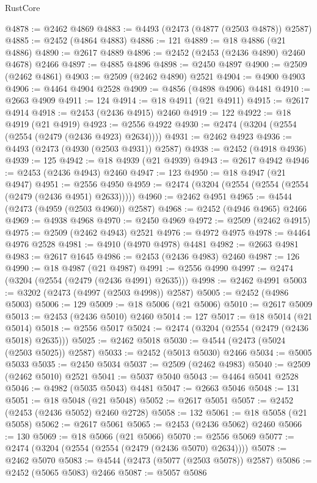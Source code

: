 \begin{lexlean}{RustCore}
\begin{coremodule}
@4878 := @2462 @4869
@4883 := @4493 (@2473 (@4877 (@2503 @4878)) @2587)
@4885 := @2452 (@4864 @4883)
@4886 := 121
@4889 := @18 @4886 (@21 @4886)
@4890 := @2617 @4889
@4896 := @2452 (@2453 (@2436 @4890) @2460 @4678) @2466
@4897 := @4885 @4896
@4898 := @2450 @4897
@4900 := @2509 (@2462 @4861)
@4903 := @2509 (@2462 @4890) @2521
@4904 := @4900 @4903
@4906 := @4464 @4904 @2528
@4909 := @4856 (@4898 @4906) @4481
@4910 := @2663 @4909
@4911 := 124
@4914 := @18 @4911 (@21 @4911)
@4915 := @2617 @4914
@4918 := @2453 (@2436 @4915) @2460
@4919 := 122
@4922 := @18 @4919 (@21 @4919)
@4923 := @2556 @4922
@4930 := @2474 (@3204 (@2554 (@2554 (@2479 (@2436 @4923) @2634))))
@4931 := @2462 @4923
@4936 := @4493 (@2473 (@4930 (@2503 @4931)) @2587)
@4938 := @2452 (@4918 @4936)
@4939 := 125
@4942 := @18 @4939 (@21 @4939)
@4943 := @2617 @4942
@4946 := @2453 (@2436 @4943) @2460
@4947 := 123
@4950 := @18 @4947 (@21 @4947)
@4951 := @2556 @4950
@4959 := @2474 (@3204 (@2554 (@2554 (@2554 (@2479 (@2436 @4951) @2633)))))
@4960 := @2462 @4951
@4965 := @4544 (@2473 (@4959 (@2503 @4960)) @2587)
@4968 := @2452 (@4946 @4965) @2466
@4969 := @4938 @4968
@4970 := @2450 @4969
@4972 := @2509 (@2462 @4915)
@4975 := @2509 (@2462 @4943) @2521
@4976 := @4972 @4975
@4978 := @4464 @4976 @2528
@4981 := @4910 (@4970 @4978) @4481
@4982 := @2663 @4981
@4983 := @2617 @1645
@4986 := @2453 (@2436 @4983) @2460
@4987 := 126
@4990 := @18 @4987 (@21 @4987)
@4991 := @2556 @4990
@4997 := @2474 (@3204 (@2554 (@2479 (@2436 @4991) @2635)))
@4998 := @2462 @4991
@5003 := @3202 (@2473 (@4997 (@2503 @4998)) @2587)
@5005 := @2452 (@4986 @5003)
@5006 := 129
@5009 := @18 @5006 (@21 @5006)
@5010 := @2617 @5009
@5013 := @2453 (@2436 @5010) @2460
@5014 := 127
@5017 := @18 @5014 (@21 @5014)
@5018 := @2556 @5017
@5024 := @2474 (@3204 (@2554 (@2479 (@2436 @5018) @2635)))
@5025 := @2462 @5018
@5030 := @4544 (@2473 (@5024 (@2503 @5025)) @2587)
@5033 := @2452 (@5013 @5030) @2466
@5034 := @5005 @5033
@5035 := @2450 @5034
@5037 := @2509 (@2462 @4983)
@5040 := @2509 (@2462 @5010) @2521
@5041 := @5037 @5040
@5043 := @4464 @5041 @2528
@5046 := @4982 (@5035 @5043) @4481
@5047 := @2663 @5046
@5048 := 131
@5051 := @18 @5048 (@21 @5048)
@5052 := @2617 @5051
@5057 := @2452 (@2453 (@2436 @5052) @2460 @2728)
@5058 := 132
@5061 := @18 @5058 (@21 @5058)
@5062 := @2617 @5061
@5065 := @2453 (@2436 @5062) @2460
@5066 := 130
@5069 := @18 @5066 (@21 @5066)
@5070 := @2556 @5069
@5077 := @2474 (@3204 (@2554 (@2554 (@2479 (@2436 @5070) @2634))))
@5078 := @2462 @5070
@5083 := @4544 (@2473 (@5077 (@2503 @5078)) @2587)
@5086 := @2452 (@5065 @5083) @2466
@5087 := @5057 @5086

\end{coremodule}
\end{lexlean}
